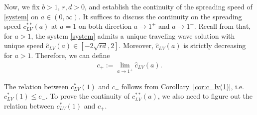 \documentclass[11pt,a4paper]{article}
\newtheorem{theorem}{\textbf{Theorem}}[section]
\numberwithin{equation}{section}
\numberwithin{figure}{section}
\newcommand\bea{\begin{eqnarray}}
\newcommand\eea{\end{eqnarray}}
\begin{document}
Now, we fix $b>1$, $r,d>0$, and establish the continuity of the spreading speed of \eqref{system} on $a\in(0,\infty)$. 
It suffices to discuss the continuity on %
the spreading speed $c^{**}_{LV}(a)$ %
at $a=1$ on both direction $a\to 1^+$ and $a\to 1^-$. 
Recall from \cite{Kan-On} that, for $a>1$, 
the system \eqref{system} admits a unique traveling wave solution with unique speed $\hat{c}_{LV}(a)\in[-2\sqrt{rd},2]$. Moreover, 
$\hat{c}_{LV}(a)$ is strictly decreasing for $a>1$.
Therefore, we can  
define 
\bea\label{c+}
c_+:=\lim_{a\to 1^+}\hat c_{LV}(a).
\eea




The relation between $c^*_{LV}(1)$ and $c_-$ follows %
from Corollary~\ref{cor:c_lv(1)},
i.e. $c^*_{LV}(1)\le c_-$. To prove the continuity of %
$c^{**}_{LV}(a)$,
we also need to figure out the relation between $c^*_{LV}(1)$ and $c_+$.
\end{document}
